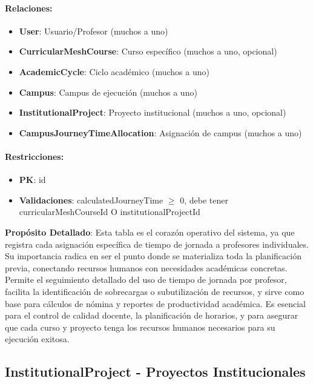 \documentclass[11pt,a4paper]{article}
\begin{document}
\paragraph{Relaciones:}
\begin{itemize}
    \item \textbf{User}: Usuario/Profesor (muchos a uno)
    \item \textbf{CurricularMeshCourse}: Curso específico (muchos a uno, opcional)
    \item \textbf{AcademicCycle}: Ciclo académico (muchos a uno)
    \item \textbf{Campus}: Campus de ejecución (muchos a uno)
    \item \textbf{InstitutionalProject}: Proyecto institucional (muchos a uno, opcional)
    \item \textbf{CampusJourneyTimeAllocation}: Asignación de campus (muchos a uno)
\end{itemize}

\paragraph{Restricciones:}
\begin{itemize}
    \item \textbf{PK}: id
    \item \textbf{Validaciones}: calculatedJourneyTime $\geq$ 0, debe tener curricularMeshCourseId O institutionalProjectId
\end{itemize}

\vspace{0.5cm}

\textbf{Propósito Detallado}: Esta tabla es el corazón operativo del sistema, ya que registra cada asignación específica de tiempo de jornada a profesores individuales. Su importancia radica en ser el punto donde se materializa toda la planificación previa, conectando recursos humanos con necesidades académicas concretas. Permite el seguimiento detallado del uso de tiempo de jornada por profesor, facilita la identificación de sobrecargas o subutilización de recursos, y sirve como base para cálculos de nómina y reportes de productividad académica. Es esencial para el control de calidad docente, la planificación de horarios, y para asegurar que cada curso y proyecto tenga los recursos humanos necesarios para su ejecución exitosa.

{\color{darkblue}\Large\subsection{InstitutionalProject - Proyectos Institucionales}}
\end{document}
